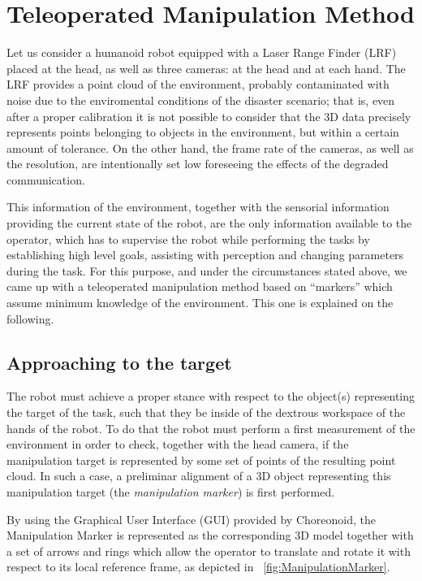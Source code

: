 \section{Teleoperated Manipulation Method}
	\label{sec:teleop_manip_method}
	
	Let us consider a humanoid robot equipped with a Laser Range Finder (LRF) placed at the head,
	as well as three cameras: at the head and at each hand.
	The LRF provides a point cloud of the environment, probably contaminated with noise due to the enviromental
	conditions of the disaster scenario; that is, even after a proper calibration it is not possible to consider
	that the 3D data precisely represents points belonging to objects in the environment, but within a certain
	amount of tolerance.
	On the other hand, the frame rate of the cameras, as well as the resolution, are intentionally set low
	foreseeing the effects of the degraded communication.
	
	This information of the environment, together with the sensorial information providing the current state of
	the robot, are the only information available to the operator, which has to supervise the robot while performing
	the tasks by establishing	high level goals, assisting with perception and changing parameters during the task.
	For this purpose, and under the circumstances stated above, we came up with a teleoperated manipulation method
	based on ``markers'' which assume minimum knowledge of the environment.
	This one is explained on the following.
	
	\subsection{Approaching to the target}
	
		The robot must achieve a proper stance with respect to the object(s) representing the target of the task,
		such that they be inside of the dextrous workspace of the hands of the robot.
		To do that the robot must perform a first measurement of the environment in order to check, together with the
		head camera, if the manipulation target is represented by some set of points of the resulting point cloud.
		In such a case, a preliminar alignment of a 3D object representing this manipulation target
		(the \emph{manipulation marker}) is first performed.
		
		By using the Graphical User Interface (GUI) provided by Choreonoid\cite{Nakaoka_Choreonoid}, the Manipulation
		Marker is represented as the corresponding 3D model together with a set of arrows and rings which allow the
		operator to translate and rotate it with respect to its local reference frame,
		as depicted in \figurename~\ref{fig:ManipulationMarker}.
		
